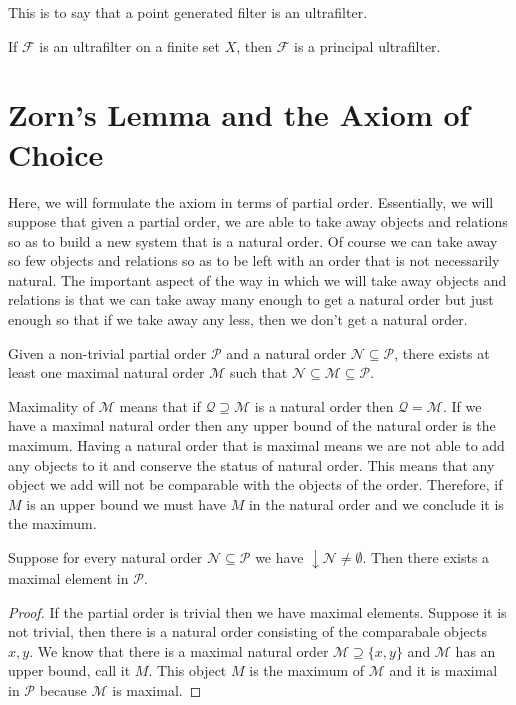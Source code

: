 \documentclass [12pt]{book}
\begin{document}
This is to say that a point generated filter is an ultrafilter.

\begin{proposition}If $\mathcal F$ is an ultrafilter on a finite set $X$, then $\mathcal F$ is a principal ultrafilter.\end{proposition}

	\section{Zorn's Lemma and the Axiom of Choice}

Here, we will formulate the axiom in terms of partial order. Essentially, we will suppose that given a partial order, we are able to take away objects and relations so as to build a new system that is a natural order. Of course we can take away so few objects and relations so as to be left with an order that is not necessarily natural. The important aspect of the way in which we will take away objects and relations is that we can take away many enough to get a natural order but just enough so that if we take away any less, then we don't get a natural order.

\begin{AOC}Given a non-trivial partial order $\mathcal P$ and a natural order $\mathcal N\subseteq\mathcal P$, there exists at least one maximal natural order $\mathcal M$ such that $\mathcal N\subseteq \mathcal M\subseteq\mathcal P$.\end{AOC}

Maximality of $\mathcal M$ means that if $\mathcal Q\supseteq\mathcal M$ is a natural order then $\mathcal Q=\mathcal M$. If we have a maximal natural order then any upper bound of the natural order is the maximum. Having a natural order that is maximal means we are not able to add any objects to it and conserve the status of natural order. This means that any object we add will not be comparable with the objects of the order. Therefore, if $M$ is an upper bound we must have $M$ in the natural order and we conclude it is the maximum.

\begin{Zlemma}Suppose for every natural order $\mathcal N\subseteq\mathcal P$ we have $\downarrow\mathcal N\neq\emptyset$. Then there exists a maximal element in $\mathcal P$.\end{Zlemma}

\begin{proof}If the partial order is trivial then we have maximal elements. Suppose it is not trivial, then there is a natural order consisting of the comparabale objects $x,y$. We know that there is a maximal natural order $\mathcal M\supseteq\{x,y\}$ and $\mathcal M$ has an upper bound, call it $M$. This object $M$ is the maximum of $\mathcal M$ and it is maximal in $\mathcal P$ because $\mathcal M$ is maximal.\end{proof}
\end{document}
